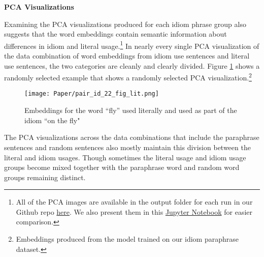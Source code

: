 \documentclass[11pt,a4paper]{article}
\begin{document}
\begin{table}[htbp]
\caption{Idiom/Literal Pair Cosine Similarity}
\label{tab:idiomlit}
\end{table}



\vspace{2mm}
\noindent \textbf{PCA Visualizations}

Examining the PCA visualizations produced for each idiom phrase group also suggests that the word embeddings contain semantic information about differences in idiom and literal usage.\footnote{All of the PCA images are available in the output folder for each run in our Github repo \href{https://github.com/spacemanidol/AnalyzingNeuralLanguageModelsGroup1/tree/master/vector_similarity/output}{here}. We also present them in this \href{https://github.com/spacemanidol/AnalyzingNeuralLanguageModelsGroup1/blob/master/vector_similarity/run_vector_similarity_words_comparison.ipynb}{Jupyter Notebook} for easier comparison.} In nearly every single PCA visualization of the data combination of word embeddings from idiom use sentences and literal use sentences, the two categories are cleanly and clearly divided. Figure \ref{fly} shows a randomly selected example that shows a randomly selected PCA visualization.\footnote{Embeddings produced from the model trained on our idiom paraphrase dataset.}

\begin{figure}[h]
\caption{Embeddings for the word ``fly'' used literally and used as part of the idiom ``on the fly"}
\label{fly}
\texttt{[image: Paper/pair\_id\_22\_fig\_lit.png]}
\end{figure}

The PCA visualizations across the data combinations that include the paraphrase sentences and random sentences also mostly maintain this division between the literal and idiom usages. Though sometimes the literal usage and idiom usage groups become mixed together with the paraphrase word and random word groups remaining distinct. 
\end{document}
